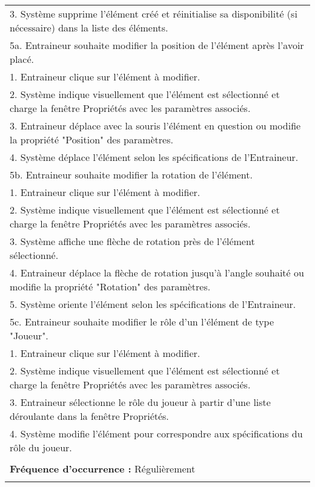 \begin{tabular}{|p{16cm}|}
	\hspace{0.5cm}3. Système supprime l'élément créé et réinitialise sa disponibilité (si nécessaire) dans la liste des éléments.\\
	5a. Entraineur souhaite modifier la position de l'élément après l'avoir placé.\\
	\hspace{0.5cm}1. Entraineur clique sur l'élément à modifier.\\
	\hspace{0.5cm}2. Système indique visuellement que l'élément est sélectionné et charge la fenêtre Propriétés avec les paramètres associés.\\
	\hspace{0.5cm}3. Entraineur déplace avec la souris l'élément en question ou modifie la propriété "Position" des paramètres.\\
	\hspace{0.5cm}4. Système déplace l'élément selon les spécifications de l'Entraineur.\\
	5b. Entraineur souhaite modifier la rotation de l'élément.\\
	\hspace{0.5cm}1. Entraineur clique sur l'élément à modifier.\\
	\hspace{0.5cm}2. Système indique visuellement que l'élément est sélectionné et charge la fenêtre Propriétés avec les paramètres associés.\\
	\hspace{0.5cm}3. Système affiche une flèche de rotation près de l'élément sélectionné.\\
	\hspace{0.5cm}4. Entraineur déplace la flèche de rotation jusqu'à l'angle souhaité ou modifie la propriété "Rotation" des paramètres.\\
	\hspace{0.5cm}5. Système oriente l'élément selon les spécifications de l'Entraineur.\\
	5c. Entraineur souhaite modifier le rôle d'un l'élément de type "Joueur".\\
	\hspace{0.5cm}1. Entraineur clique sur l'élément à modifier.\\
	\hspace{0.5cm}2. Système indique visuellement que l'élément est sélectionné et charge la fenêtre Propriétés avec les paramètres associés.\\
	\hspace{0.5cm}3. Entraineur sélectionne le rôle du joueur à partir d'une liste déroulante dans la fenêtre Propriétés.\\
	\hspace{0.5cm}4. Système modifie l'élément pour correspondre aux spécifications du rôle du joueur.\\
	\\
	\textbf{Fréquence d'occurrence :} Régulièrement\\
	\\
	\hline
\end{tabular}

